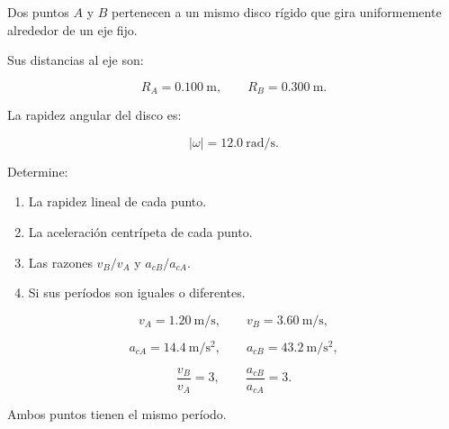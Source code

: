 \begin{ejercicio}
Dos puntos \(A\) y \(B\) pertenecen a un mismo disco rígido
que gira uniformemente alrededor de un eje fijo.

Sus distancias al eje son:

\[
R_A=\SI{0.100}{\meter},
\qquad
R_B=\SI{0.300}{\meter}.
\]

La rapidez angular del disco es:

\[
|\omega|=\SI{12.0}{\radian\per\second}.
\]

Determine:

\begin{enumerate}[label=\alph*)]
    \item La rapidez lineal de cada punto.
    \item La aceleración centrípeta de cada punto.
    \item Las razones \(v_B/v_A\) y \(a_{cB}/a_{cA}\).
    \item Si sus períodos son iguales o diferentes.
\end{enumerate}
\end{ejercicio}

\begin{respuesta}
\[
v_A=\SI{1.20}{\meter\per\second},
\qquad
v_B=\SI{3.60}{\meter\per\second},
\]

\[
a_{cA}=\SI{14.4}{\meter\per\second\squared},
\qquad
a_{cB}=\SI{43.2}{\meter\per\second\squared},
\]

\[
\boxed{\frac{v_B}{v_A}=3},
\qquad
\boxed{\frac{a_{cB}}{a_{cA}}=3}.
\]

Ambos puntos tienen el mismo período.
\end{respuesta}


